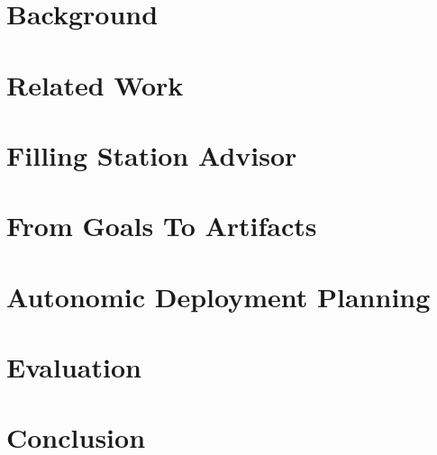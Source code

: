 \documentclass[mestrado]{pacotes/unb-cic}
\begin{document}
%
%
%
%

%

\chapter{Background}


%
%
%
%
%
%


\chapter{Related Work}
%
%
%
%
%
%
%

%


\chapter{Filling Station Advisor}


\chapter{From Goals To Artifacts}


\chapter{Autonomic Deployment Planning}


%
\chapter{Evaluation}

%
\chapter{Conclusion}

%

\postextual
\anexos




\end{document}
